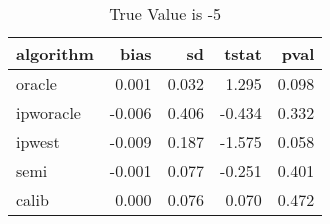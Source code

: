 \begin{table}[h!]

\caption{True Value is -5}
\centering
\begin{tabular}[t]{lrrrr}
\toprule
algorithm & bias & sd & tstat & pval\\
\midrule
oracle & 0.001 & 0.032 & 1.295 & 0.098\\
ipworacle & -0.006 & 0.406 & -0.434 & 0.332\\
ipwest & -0.009 & 0.187 & -1.575 & 0.058\\
semi & -0.001 & 0.077 & -0.251 & 0.401\\
calib & 0.000 & 0.076 & 0.070 & 0.472\\
\bottomrule
\end{tabular}
\end{table}
